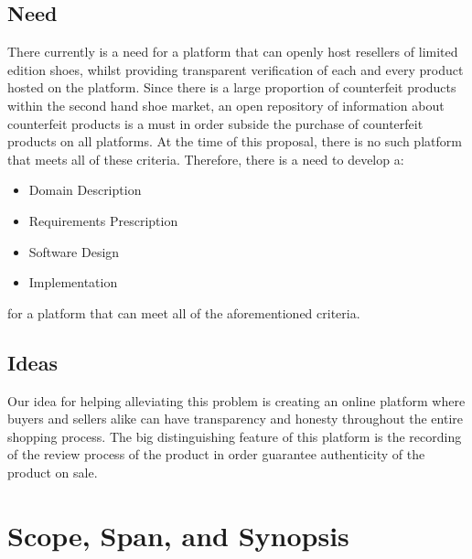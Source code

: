 \subsection{Need}
\hspace{1cm} There currently is a need for a platform that can openly host resellers of limited edition shoes, whilst providing transparent verification of each and every product hosted on the platform. Since there is a large proportion of counterfeit products within the second hand shoe market, an open repository of information about counterfeit products is a must in order subside the purchase of counterfeit products on all platforms. At the time of this proposal, there is no such platform that meets all of these criteria. Therefore, there is a need to develop a:
\begin{itemize}
  \item Domain Description
  \item Requirements Prescription
  \item Software Design
  \item Implementation
\end{itemize}
for a platform that can meet all of the aforementioned criteria.
\subsection{Ideas}
Our idea for helping alleviating this problem is creating an online platform where buyers and sellers alike can have transparency and honesty throughout the entire shopping process. The big distinguishing feature of this platform is the recording of the review process of the product in order guarantee authenticity of the product on sale.
\section{Scope, Span, and Synopsis}
